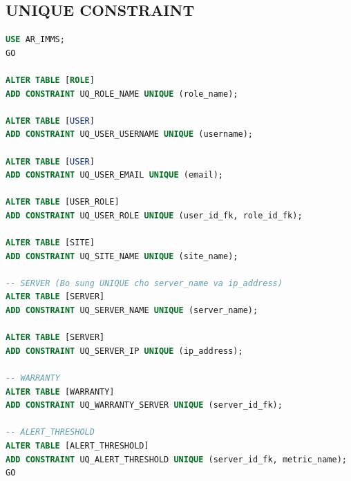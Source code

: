 \subsection{UNIQUE CONSTRAINT}
\begin{lstlisting}[language=SQL]
USE AR_IMMS;
GO

ALTER TABLE [ROLE]
ADD CONSTRAINT UQ_ROLE_NAME UNIQUE (role_name);

ALTER TABLE [USER]
ADD CONSTRAINT UQ_USER_USERNAME UNIQUE (username);

ALTER TABLE [USER]
ADD CONSTRAINT UQ_USER_EMAIL UNIQUE (email);

ALTER TABLE [USER_ROLE]
ADD CONSTRAINT UQ_USER_ROLE UNIQUE (user_id_fk, role_id_fk);

ALTER TABLE [SITE]
ADD CONSTRAINT UQ_SITE_NAME UNIQUE (site_name);

-- SERVER (Bo sung UNIQUE cho server_name va ip_address)
ALTER TABLE [SERVER]
ADD CONSTRAINT UQ_SERVER_NAME UNIQUE (server_name);

ALTER TABLE [SERVER]
ADD CONSTRAINT UQ_SERVER_IP UNIQUE (ip_address);

-- WARRANTY
ALTER TABLE [WARRANTY]
ADD CONSTRAINT UQ_WARRANTY_SERVER UNIQUE (server_id_fk);

-- ALERT_THRESHOLD
ALTER TABLE [ALERT_THRESHOLD]
ADD CONSTRAINT UQ_ALERT_THRESHOLD UNIQUE (server_id_fk, metric_name);
GO
\end{lstlisting}


